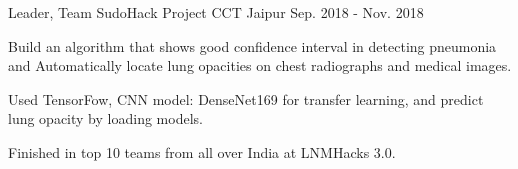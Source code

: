 \begin{cventries}

  \cventry
  {Leader, Team SudoHack Project}
  {\href{https://github.com/LNMHacks/LNMHacks-3.0-Submission/sudo hack}{}}
  {CCT Jaipur}
  {Sep. 2018 - Nov. 2018}
  {
    \begin{cvitems}
      \item Build an algorithm that shows good confidence interval in detecting pneumonia
        and Automatically locate lung opacities on chest radiographs and medical images. 
      \item Used TensorFow, CNN model: DenseNet169 for transfer learning,
        and predict lung opacity by loading models.
      \item Finished in top 10 teams from all over India at LNMHacks 3.0.
    \end{cvitems}
  }
 


\end{cventries}

